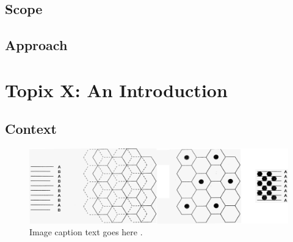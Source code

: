\documentclass[pdftex,12pt,a4paper]{article}
\begin{document}
\subsection{Scope} \label{sec:scope}
\blindtext		%

\subsection{Approach} \label{sec:approach}
\blindtext		%

\newpage

\section{\textbf{Topix X: An Introduction}} \label{sec:introduction}
\subsection{Context} \label{sec: context}
\blindtext		%
\cite{Goodenough2010}	%

\begin{figure}[h]	%
	\centering
	\includegraphics[scale=0.15]{Images/ABABAB_AAAA_Transition}
	\captionsetup{justification=centering}	%
	\caption{Image caption text goes here \cite{1994Levy}.}
	\label{fig:graphite_structure}	%
\end{figure}

\blindtext		%
\end{document}

